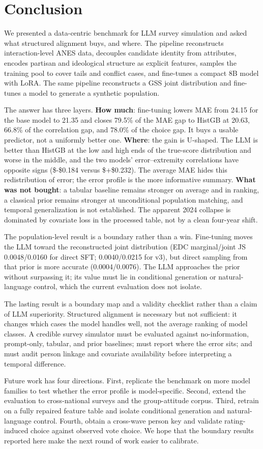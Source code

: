 \section{Conclusion}\label{conclusion}

We presented a data-centric benchmark for LLM survey simulation and
asked what structured alignment buys, and where. The pipeline
reconstructs interaction-level ANES data, decouples candidate identity
from attributes, encodes partisan and ideological structure as explicit
features, samples the training pool to cover tails and conflict cases,
and fine-tunes a compact 8B model with LoRA. The same pipeline
reconstructs a GSS joint distribution and fine-tunes a model to generate
a synthetic population.

The answer has three layers. \textbf{How much}: fine-tuning lowers MAE
from 24.15 for the base model to 21.35 and closes 79.5\% of the MAE gap
to HistGB at 20.63, 66.8\% of the correlation gap, and 78.0\% of the
choice gap. It buys a usable predictor, not a uniformly better one.
\textbf{Where}: the gain is U-shaped. The LLM is better than HistGB at
the low and high ends of the true-score distribution and worse in the
middle, and the two models' error--extremity correlations have opposite
signs (\$-\$0.184 versus \$+\$0.232). The average MAE hides this
redistribution of error; the error profile is the more informative
summary. \textbf{What was not bought}: a tabular baseline remains
stronger on average and in ranking, a classical prior remains stronger
at unconditional population matching, and temporal generalization is not
established. The apparent 2024 collapse is dominated by covariate loss
in the processed table, not by a clean four-year shift.

The population-level result is a boundary rather than a win. Fine-tuning
moves the LLM toward the reconstructed joint distribution (EDC
marginal/joint JS 0.0048/0.0160 for direct SFT; 0.0040/0.0215 for v3),
but direct sampling from that prior is more accurate (0.0004/0.0076).
The LLM approaches the prior without surpassing it; its value must lie
in conditional generation or natural-language control, which the current
evaluation does not isolate.

The lasting result is a boundary map and a validity checklist rather
than a claim of LLM superiority. Structured alignment is necessary but
not sufficient: it changes which cases the model handles well, not the
average ranking of model classes. A credible survey simulator must be
evaluated against no-information, prompt-only, tabular, and prior
baselines; must report where the error sits; and must audit person
linkage and covariate availability before interpreting a temporal
difference.

Future work has four directions. First, replicate the benchmark on more
model families to test whether the error profile is model-specific.
Second, extend the evaluation to cross-national surveys and the
group-attitude corpus. Third, retrain on a fully repaired feature table
and isolate conditional generation and natural-language control. Fourth,
obtain a cross-wave person key and validate rating-induced choice
against observed vote choice. We hope that the boundary results reported
here make the next round of work easier to calibrate.

